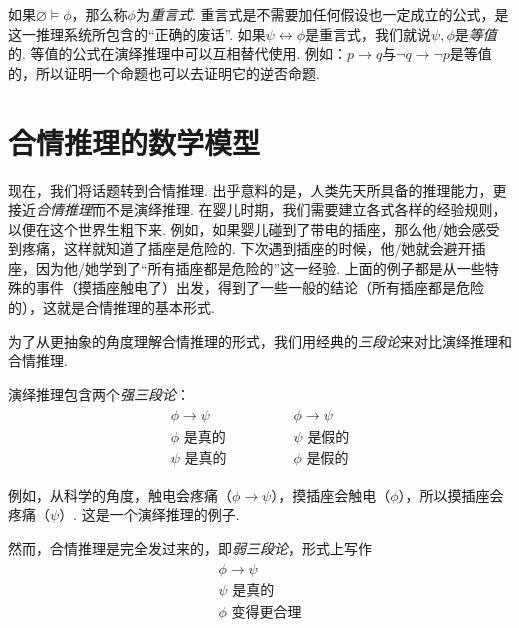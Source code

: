 如果$\varnothing\vDash \phi$，那么称$\phi$为\emph{重言式}. 重言式是不需要加任何假设也一定成立的公式，是这一推理系统所包含的“正确的废话”. 如果$\psi\leftrightarrow\phi$是重言式，我们就说$\psi,\phi$是\emph{等值}的. 等值的公式在演绎推理中可以互相替代使用. 例如：$p\to q$与$\neg q\to\neg p$是等值的，所以证明一个命题也可以去证明它的逆否命题.


\section{合情推理的数学模型}

现在，我们将话题转到合情推理. 出乎意料的是，人类先天所具备的推理能力，更接近\emph{合情推理}而不是演绎推理. 在婴儿时期，我们需要建立各式各样的经验规则，以便在这个世界生粗下来. 例如，如果婴儿碰到了带电的插座，那么他/她会感受到疼痛，这样就知道了插座是危险的. 下次遇到插座的时候，他/她就会避开插座，因为他/她学到了“所有插座都是危险的”这一经验. 上面的例子都是从一些特殊的事件（摸插座触电了）出发，得到了一些一般的结论（所有插座都是危险的），这就是合情推理的基本形式.

为了从更抽象的角度理解合情推理的形式，我们用经典的\emph{三段论}来对比演绎推理和合情推理. 

演绎推理包含两个\emph{强三段论}：
    \[
        \begin{array}{c}
            \begin{array}{c}  
                \phi \to \psi \\ \phi\text{ 是真的} \\ \hline \psi\text{ 是真的}
            \end{array} 
            \qquad \qquad 
            \begin{array}{c}  
                \phi \to \psi \\ \psi\text{ 是假的} \\ \hline \phi\text{ 是假的}
            \end{array}
        \end{array} 
    \]

例如，从科学的角度，触电会疼痛（$\phi\to \psi$），摸插座会触电（$\phi$），所以摸插座会疼痛（$\psi$）. 这是一个演绎推理的例子.

然而，合情推理是完全发过来的，即\emph{弱三段论}，形式上写作 
        \[
        \begin{array}{c}
            \begin{array}{c}  
                \phi \to \psi \\ \psi\text{ 是真的} \\ \hline \phi\text{ 变得更合理}
            \end{array} 
        \end{array} 
    \]

